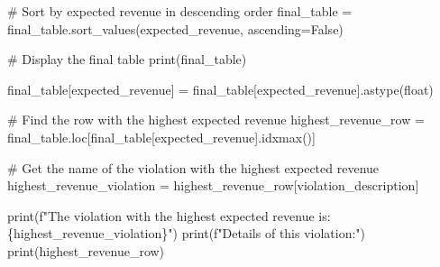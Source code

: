 \documentclass[
  letterpaper,
  DIV=11,
  numbers=noendperiod]{scrartcl}
\newenvironment{Shaded}{\begin{snugshade}}{\end{snugshade}}
\newcommand{\BuiltInTok}[1]{\textcolor[rgb]{0.00,0.23,0.31}{#1}}
\newcommand{\CommentTok}[1]{\textcolor[rgb]{0.37,0.37,0.37}{#1}}
\newcommand{\NormalTok}[1]{\textcolor[rgb]{0.00,0.23,0.31}{#1}}
\newcommand{\OperatorTok}[1]{\textcolor[rgb]{0.37,0.37,0.37}{#1}}
\newcommand{\SpecialCharTok}[1]{\textcolor[rgb]{0.37,0.37,0.37}{#1}}
\newcommand{\SpecialStringTok}[1]{\textcolor[rgb]{0.13,0.47,0.30}{#1}}
\newcommand{\StringTok}[1]{\textcolor[rgb]{0.13,0.47,0.30}{#1}}
\newcommand{\VariableTok}[1]{\textcolor[rgb]{0.07,0.07,0.07}{#1}}
\begin{document}
\begin{Shaded}
\begin{Highlighting}[]
\CommentTok{\# Sort by expected revenue in descending order}
\NormalTok{final\_table }\OperatorTok{=}\NormalTok{ final\_table.sort\_values(}\StringTok{\textquotesingle{}expected\_revenue\textquotesingle{}}\NormalTok{, ascending}\OperatorTok{=}\VariableTok{False}\NormalTok{)}

\CommentTok{\# Display the final table}
\BuiltInTok{print}\NormalTok{(final\_table)}

\NormalTok{final\_table[}\StringTok{\textquotesingle{}expected\_revenue\textquotesingle{}}\NormalTok{] }\OperatorTok{=}\NormalTok{ final\_table[}\StringTok{\textquotesingle{}expected\_revenue\textquotesingle{}}\NormalTok{].astype(}\BuiltInTok{float}\NormalTok{)}

\CommentTok{\# Find the row with the highest expected revenue}
\NormalTok{highest\_revenue\_row }\OperatorTok{=}\NormalTok{ final\_table.loc[final\_table[}\StringTok{\textquotesingle{}expected\_revenue\textquotesingle{}}\NormalTok{].idxmax()]}

\CommentTok{\# Get the name of the violation with the highest expected revenue}
\NormalTok{highest\_revenue\_violation }\OperatorTok{=}\NormalTok{ highest\_revenue\_row[}\StringTok{\textquotesingle{}violation\_description\textquotesingle{}}\NormalTok{]}

\BuiltInTok{print}\NormalTok{(}\SpecialStringTok{f"The violation with the highest expected revenue is: }\SpecialCharTok{\{}\NormalTok{highest\_revenue\_violation}\SpecialCharTok{\}}\SpecialStringTok{"}\NormalTok{)}
\BuiltInTok{print}\NormalTok{(}\SpecialStringTok{f"Details of this violation:"}\NormalTok{)}
\BuiltInTok{print}\NormalTok{(highest\_revenue\_row)}
\end{Highlighting}
\end{Shaded}
\end{document}
